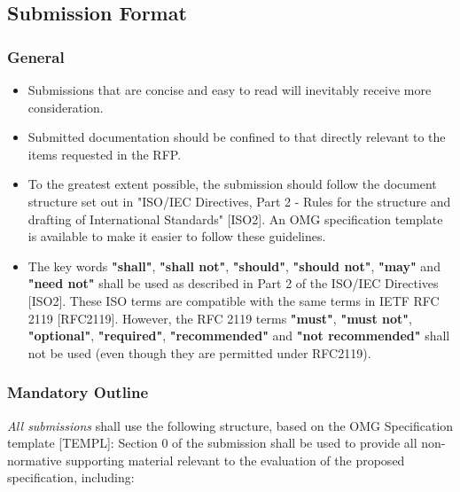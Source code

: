 \subsection{Submission Format}\label{subformat}
\subsubsection{General}

\begin{itemize}
\item    Submissions that are concise and easy to read will inevitably receive more consideration.
\item    Submitted documentation should be confined to that directly relevant to the items requested in the RFP.
\item    To the greatest extent possible, the submission should follow the document structure set out in "ISO/IEC Directives, Part 2 - Rules for the structure and drafting of International Standards" [ISO2]. An OMG specification template is available to make it easier to follow these guidelines.
\item    The key words \textbf{"shall"}, \textbf{"shall not"}, \textbf{"should"}, \textbf{"should not"}, \textbf{"may"} and \textbf{"need not"} shall be used as described in Part 2 of the ISO/IEC Directives [ISO2]. These ISO terms are compatible with the same terms in IETF RFC 2119 [RFC2119]. However, the RFC 2119 terms \textbf{"must"}, \textbf{"must not"}, \textbf{"optional"}, \textbf{"required"}, \textbf{"recommended"} and \textbf{"not recommended"} shall not be used (even though they are permitted under RFC2119).
\end{itemize}


\subsubsection{Mandatory Outline}

\textit{All submissions} shall use the following structure, based on the OMG Specification template [TEMPL]:
Section 0 of the submission shall be used to provide all non-normative supporting material relevant to the evaluation of the proposed specification, including:

